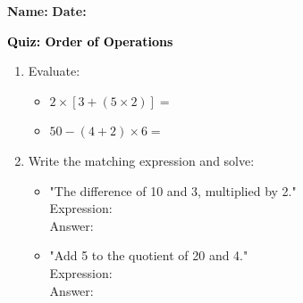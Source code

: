 \documentclass[12pt, letterpaper, fleqn]{article}
\newcommand{\blank}{\underline{\hspace{2.2cm}}}
\newcommand{\blanklong}{\underline{\hspace{6.5cm}}}
\begin{document}
\textbf{Name:} \underline{\hspace{5cm}}
\hfill
\textbf{Date:} \underline{\hspace{3cm}}\\

\begin{tcolorbox}[colback=customteal!20]
    \large\textcolor{black}{\textbf{Quiz: Order of Operations}}
\end{tcolorbox}

\vspace{5mm}
\begin{enumerate}[itemsep=3cm, leftmargin=0.6cm]
\item Evaluate:
  \begin{itemize}[itemsep=1cm]
    \item $2 \times [3 + (5 \times 2)] = $ \blank
    \item $50 - (4 + 2) \times 6 = $ \blank
  \end{itemize}

\item Write the matching expression and solve:
  \begin{itemize}[itemsep=1.5cm]
    \item "The difference of 10 and 3, multiplied by 2." \\ Expression: \blanklong \\ Answer: \blank
    \item "Add 5 to the quotient of 20 and 4." \\ Expression: \blanklong \\ Answer: \blank
  \end{itemize}
\end{enumerate}
\end{document}
